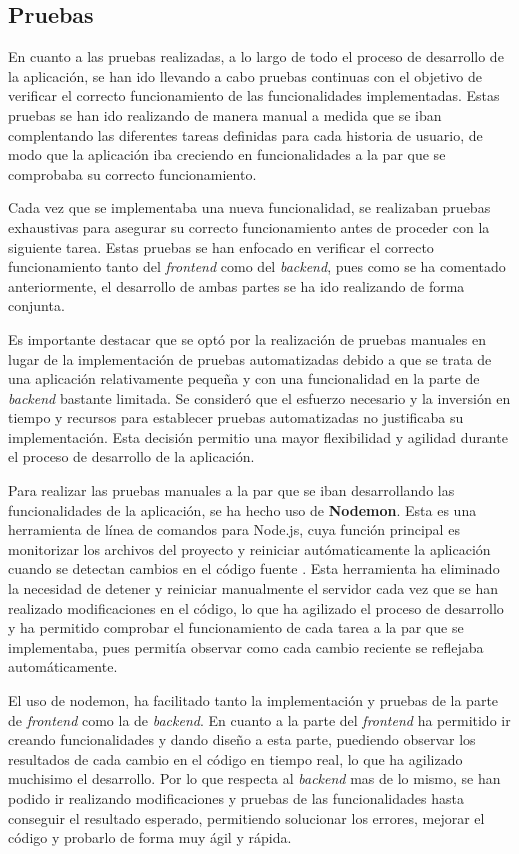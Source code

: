 \documentclass[11pt]{article}
\begin{document}
\clearpage
\subsection{Pruebas}
En cuanto a las pruebas realizadas, a lo largo de todo el proceso de desarrollo de la aplicación, se han ido llevando a cabo pruebas continuas
con el objetivo de verificar el correcto funcionamiento de las funcionalidades implementadas. Estas pruebas se han ido realizando de manera manual 
a medida que se iban complentando las diferentes tareas definidas para cada historia de usuario, de modo que la aplicación iba creciendo en funcionalidades 
a la par que se comprobaba su correcto funcionamiento.

Cada vez que se implementaba una nueva funcionalidad, se realizaban pruebas exhaustivas para asegurar su correcto funcionamiento antes de proceder con la 
siguiente tarea. Estas pruebas se han enfocado en verificar el correcto funcionamiento tanto del \textit{frontend} como del \textit{backend}, pues como se ha comentado anteriormente, 
el desarrollo de ambas partes se ha ido realizando de forma conjunta.

Es importante destacar que se optó por la realización de pruebas manuales en lugar de la implementación de pruebas automatizadas debido a que se 
trata de una aplicación relativamente pequeña y con una funcionalidad en la parte de \textit{backend} bastante limitada. Se consideró que el esfuerzo necesario y la inversión
en tiempo y recursos para establecer pruebas automatizadas no justificaba su implementación. Esta decisión permitio una mayor flexibilidad y agilidad durante
el proceso de desarrollo de la aplicación.

Para realizar las pruebas manuales a la par que se iban desarrollando las funcionalidades de la aplicación, se ha hecho uso de \textbf{Nodemon}. 
Esta es una herramienta de línea de comandos para Node.js, cuya función principal es monitorizar los archivos del proyecto y reiniciar autómaticamente
la aplicación cuando se detectan cambios en el código fuente \cite{nodemon}. 
Esta herramienta ha eliminado la necesidad de detener y reiniciar manualmente el servidor cada vez que se han realizado modificaciones en el código, 
lo que ha agilizado el proceso de desarrollo y ha permitido comprobar el funcionamiento de cada tarea a la par que se implementaba, pues permitía observar como
cada cambio reciente se reflejaba automáticamente.

El uso de nodemon, ha facilitado tanto la implementación y pruebas de la parte de \textit{frontend} como la de \textit{backend}. En cuanto a la parte del \textit{frontend}
ha permitido ir creando funcionalidades y dando diseño a esta parte, puediendo observar los resultados de cada cambio en el código en tiempo real,
lo que ha agilizado muchisimo el desarrollo. Por lo que respecta al \textit{backend} mas de lo mismo, se han podido ir realizando modificaciones y pruebas de las funcionalidades
hasta conseguir el resultado esperado, permitiendo solucionar los errores, mejorar el código y probarlo de forma muy ágil y rápida. 
\end{document}
